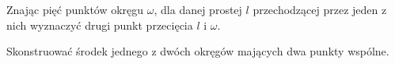 \begin{geoconstruction}
    Znając pięć punktów okręgu $\omega$, dla danej prostej $l$ przechodzącej przez jeden z nich wyznaczyć drugi punkt przecięcia $l$ i $\omega$.
\end{geoconstruction}


\begin{geoconstruction}
    Skonstruować środek jednego z dwóch okręgów mających dwa punkty wspólne.
\end{geoconstruction}

